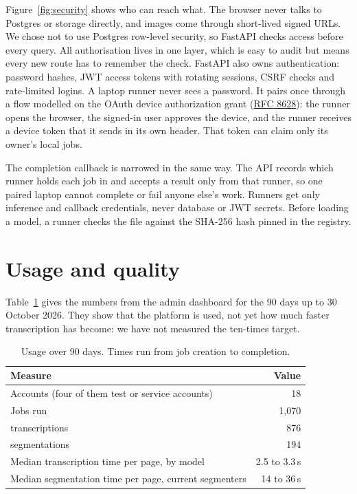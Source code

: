 \documentclass[11pt,a4paper]{article}
\begin{document}
Figure~\ref{fig:security} shows who can reach what. The browser never talks to Postgres or storage directly, and images come through short-lived signed URLs. We chose not to use Postgres row-level security, so FastAPI checks access before every query. All authorisation lives in one layer, which is easy to audit but means every new route has to remember the check. FastAPI also owns authentication: password hashes, JWT access tokens with rotating sessions, CSRF checks and rate-limited logins. A laptop runner never sees a password. It pairs once through a flow modelled on the OAuth device authorization grant (\href{https://www.rfc-editor.org/rfc/rfc8628}{RFC 8628}): the runner opens the browser, the signed-in user approves the device, and the runner receives a device token that it sends in its own header. That token can claim only its owner's local jobs.

The completion callback is narrowed in the same way. The API records which runner holds each job in  and accepts a result only from that runner, so one paired laptop cannot complete or fail anyone else's work. Runners get only inference and callback credentials, never database or JWT secrets. Before loading a model, a runner checks the file against the SHA-256 hash pinned in the registry.

\section{Usage and quality}

Table~\ref{tab:usage} gives the numbers from the admin dashboard for the 90 days up to 30 October 2026. They show that the platform is used, not yet how much faster transcription has become: we have not measured the ten-times target.

\begin{table}[ht]
\centering
\small
\begin{tabular}{@{}l r@{}}
\toprule
Measure & Value \\
\midrule
Accounts (four of them test or service accounts) & 18 \\
Jobs run & 1,070 \\
\quad transcriptions & 876 \\
\quad segmentations & 194 \\
Median transcription time per page, by model & 2.5 to 3.3\,s \\
Median segmentation time per page, current segmenters & 14 to 36\,s \\
\bottomrule
\end{tabular}
\caption{Usage over 90 days. Times run from job creation to completion.}
\label{tab:usage}
\end{table}
\end{document}
